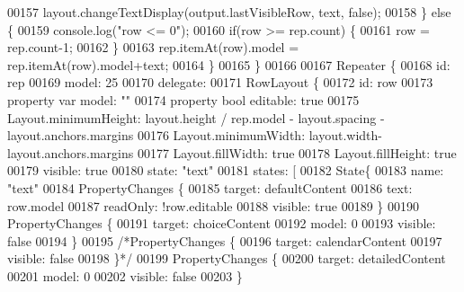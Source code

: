 \begin{DoxyCode}
00157                 layout.changeTextDisplay(output.lastVisibleRow, text, \textcolor{keyword}{false});
00158             \} \textcolor{keywordflow}{else} \{
00159                 console.log(\textcolor{stringliteral}{"row <= 0"});
00160                 \textcolor{keywordflow}{if}(row >= rep.count) \{
00161                     row = rep.count-1;
00162                 \}
00163                 rep.itemAt(row).model = rep.itemAt(row).model+text;
00164             \}
00165         \}
00166 
00167         Repeater \{
00168             \textcolor{keywordtype}{id}: rep
00169             model: 25
00170             delegate:
00171                 RowLayout \{
00172                 \textcolor{keywordtype}{id}: row
00173                 \textcolor{keyword}{property} var model: \textcolor{stringliteral}{""}
00174                 \textcolor{keyword}{property} \textcolor{keywordtype}{bool} editable: \textcolor{keyword}{true}
00175                 Layout.minimumHeight: layout.height / rep.model - layout.spacing -layout.anchors.margins
00176                 Layout.minimumWidth: layout.width-layout.anchors.margins
00177                 Layout.fillWidth: \textcolor{keyword}{true}
00178                 Layout.fillHeight: \textcolor{keyword}{true}
00179                 visible: \textcolor{keyword}{true}
00180                 state: \textcolor{stringliteral}{"text"}
00181                 states: [
00182                     State\{
00183                         name: \textcolor{stringliteral}{"text"}
00184                         PropertyChanges \{
00185                             target: defaultContent
00186                             text: row.model
00187                             readOnly:  !row.editable
00188                             visible: \textcolor{keyword}{true}
00189                         \}
00190                         PropertyChanges \{
00191                             target: choiceContent
00192                             model: 0
00193                             visible: \textcolor{keyword}{false}
00194                         \}
00195                         \textcolor{comment}{/*PropertyChanges \{}
00196 \textcolor{comment}{                            target: calendarContent}
00197 \textcolor{comment}{                            visible: false}
00198 \textcolor{comment}{                        \}*/}
00199                         PropertyChanges \{
00200                             target: detailedContent
00201                             model: 0
00202                             visible: \textcolor{keyword}{false}
00203                         \}

\end{DoxyCode}

